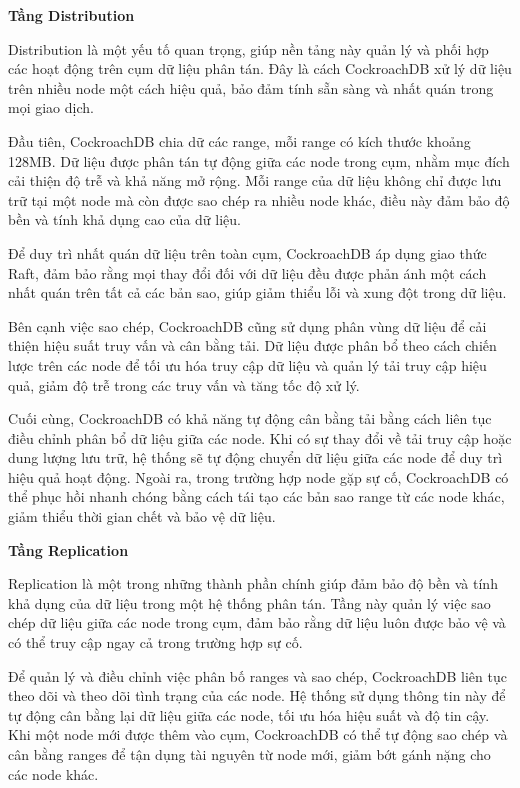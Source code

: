 \documentclass{article}[13pt]
\begin{document}
\textbf{Tầng Distribution}

Distribution là một yếu tố quan trọng, giúp nền tảng này quản lý và phối hợp các hoạt động trên cụm dữ liệu phân tán. Đây là cách CockroachDB xử lý dữ liệu trên nhiều node một cách hiệu quả, bảo đảm tính sẵn sàng và nhất quán trong mọi giao dịch.

Đầu tiên, CockroachDB chia dữ các range, mỗi range có kích thước khoảng 128MB. Dữ liệu được phân tán tự động giữa các node trong cụm, nhằm mục đích cải thiện độ trễ và khả năng mở rộng. Mỗi range của dữ liệu không chỉ được lưu trữ tại một node mà còn được sao chép ra nhiều node khác, điều này đảm bảo độ bền và tính khả dụng cao của dữ liệu.

Để duy trì nhất quán dữ liệu trên toàn cụm, CockroachDB áp dụng giao thức Raft, đảm bảo rằng mọi thay đổi đối với dữ liệu đều được phản ánh một cách nhất quán trên tất cả các bản sao, giúp giảm thiểu lỗi và xung đột trong dữ liệu.

Bên cạnh việc sao chép, CockroachDB cũng sử dụng phân vùng dữ liệu để cải thiện hiệu suất truy vấn và cân bằng tải. Dữ liệu được phân bổ theo cách chiến lược trên các node để tối ưu hóa truy cập dữ liệu và quản lý tải truy cập hiệu quả, giảm độ trễ trong các truy vấn và tăng tốc độ xử lý.

Cuối cùng, CockroachDB có khả năng tự động cân bằng tải bằng cách liên tục điều chỉnh phân bổ dữ liệu giữa các node. Khi có sự thay đổi về tải truy cập hoặc dung lượng lưu trữ, hệ thống sẽ tự động chuyển dữ liệu giữa các node để duy trì hiệu quả hoạt động. Ngoài ra, trong trường hợp node gặp sự cố, CockroachDB có thể phục hồi nhanh chóng bằng cách tái tạo các bản sao range từ các node khác, giảm thiểu thời gian chết và bảo vệ dữ liệu.

\textbf{Tầng Replication}

Replication là một trong những thành phần chính giúp đảm bảo độ bền và tính khả dụng của dữ liệu trong một hệ thống phân tán. Tầng này quản lý việc sao chép dữ liệu giữa các node trong cụm, đảm bảo rằng dữ liệu luôn được bảo vệ và có thể truy cập ngay cả trong trường hợp sự cố.

Để quản lý và điều chỉnh việc phân bố ranges và sao chép, CockroachDB liên tục theo dõi và theo dõi tình trạng của các node. Hệ thống sử dụng thông tin này để tự động cân bằng lại dữ liệu giữa các node, tối ưu hóa hiệu suất và độ tin cậy. Khi một node mới được thêm vào cụm, CockroachDB có thể tự động sao chép và cân bằng ranges để tận dụng tài nguyên từ node mới, giảm bớt gánh nặng cho các node khác.
\end{document}
